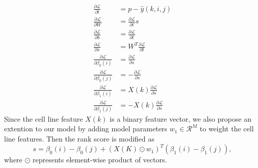 \begin{align*}
\frac{\partial \mathcal{L}}{\partial t} &= p - \hat{y}(k,i,j) \\
\frac{\partial \mathcal{L}}{\partial W} &= \frac{\partial \mathcal{L}}{\partial t} s\\
\frac{\partial \mathcal{L}}{\partial b} &= \frac{\partial \mathcal{L}}{\partial t} \\
\frac{\partial \mathcal{L}}{\partial s} &= W^T \frac{\partial \mathcal{L}}{\partial t} \\
\frac{\partial \mathcal{L}}{\partial \beta_0(i)} &= \frac{\partial \mathcal{L}}{\partial s} \\
\frac{\partial \mathcal{L}}{\partial \beta_0(j)} &= -\frac{\partial \mathcal{L}}{\partial s} \\
\frac{\partial \mathcal{L}}{\partial \beta_1(i)} &=  X(k) \frac{\partial \mathcal{L}}{\partial s} \\
\frac{\partial \mathcal{L}}{\partial \beta_1(j)} &=  -X(k) \frac{\partial \mathcal{L}}{\partial s}
\end{align*}
Since the cell line feature $X(k)$ is a binary feature vector, we also propose an extention to our model by adding model parameters $w_1 \in \mathcal{R}^ M$ to weight the cell line features. Then the rank score is modified as 
\begin{equation}
s = \beta_0(i) - \beta_0(j) + (X(K) \odot w_1)^T (\beta_1(i) - \beta_1(j)),
\end{equation}
where $\odot$ represents element-wise product of vectors.
